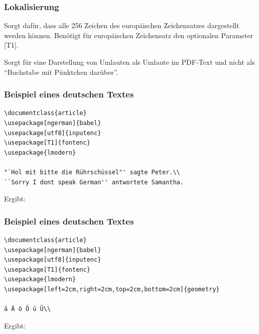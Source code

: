 \begin{frame}
\frametitle{Lokalisierung}
\begin{description}[<+->]
  \item[fontenc] Sorgt dafür, dass alle 256 Zeichen des europäischen Zeichensatzes dargestellt werden können. Benötigt für europäischen Zeichensatz den optionalen Parameter [T1].
  \item[lmodern] Sorgt für eine Darstellung von Umlauten als Umlaute im PDF-Text und nicht als ``Buchstabe mit Pünktchen darüber''.
\end{description}
\pause
\end{frame}



\begin{frame}[fragile]
\frametitle{Beispiel eines deutschen Textes}
\begin{lstlisting}[style=Latex]
\documentclass{article}
\usepackage[ngerman]{babel}
\usepackage[utf8]{inputenc}
\usepackage[T1]{fontenc}
\usepackage{lmodern}

"`Hol mit bitte die Rührschüssel"' sagte Peter.\\
``Sorry I dont speak German'' antwortete Samantha.

\end{lstlisting} \vspace{-20pt}
\pause
Ergibt:
\end{frame}

\begin{frame}[fragile]
\frametitle{Beispiel eines deutschen Textes}
\begin{lstlisting}[style=Latex]
\documentclass{article}
\usepackage[ngerman]{babel}
\usepackage[utf8]{inputenc}
\usepackage[T1]{fontenc}
\usepackage{lmodern}
\usepackage[left=2cm,right=2cm,top=2cm,bottom=2cm]{geometry}

ä Ä ö Ö ü Ü\\

\end{lstlisting} \vspace{-20pt}
\pause
Ergibt:
\end{frame}



